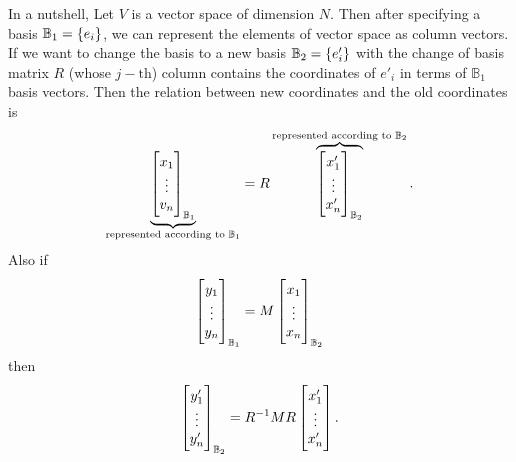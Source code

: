 \begin{summary}
	In a nutshell, Let $ V $ is a vector space of dimension $ N $. Then after specifying a basis $ \mathbb{B}_1 = \{e_i\} $, we can represent the elements of vector space as column vectors. If we want to change the basis to a new basis $ \mathbb{B}_2 = \{e'_i\} $ with the change of basis matrix $ R $ (whose $ j-\text{th} $) column contains the coordinates of $ e'_i $ in terms of $ \mathbb{B}_1 $ basis vectors. Then the relation between new coordinates and the old coordinates is 
	\[ \underbrace{\begin{bmatrix} x_1 \\ \vdots \\ v_n \end{bmatrix}_{\mathbb{B}_1} }_\text{represented according to $ \mathbb{B}_1 $}= R \overbrace{\begin{bmatrix} x'_1 \\ \vdots \\ x'_n \end{bmatrix}_{\mathbb{B}_2}}^{\text{represented according to $ \mathbb{B}_2 $}}. \]
	Also if 
	\[ \begin{bmatrix} y_1 \\ \vdots \\ y_n \end{bmatrix}_{\mathbb{B}_1} = M \begin{bmatrix} x_1 \\ \vdots \\ x_n \end{bmatrix}_{\mathbb{B}_2} \]
	then 
	\[ \begin{bmatrix} y'_1 \\ \vdots \\ y'_n \end{bmatrix}_{\mathbb{B}_2} = R^{-1}M R \begin{bmatrix} x'_1 \\ \vdots \\ x'_n \end{bmatrix}. \]
\end{summary}

